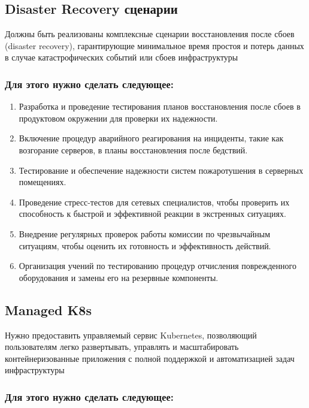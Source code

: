 \documentclass[14pt, a4paper]{extarticle}
\begin{document}
\subsection{Disaster Recovery сценарии}

Должны быть реализованы комплексные сценарии восстановления после сбоев (disaster recovery), гарантирующие минимальное время простоя и потерь данных в случае катастрофических событий или сбоев инфраструктуры

\subsubsection*{Для этого нужно сделать следующее:}

\begin{enumerate}
\item Разработка и проведение тестирования планов восстановления после сбоев в продуктовом окружении для проверки их надежности.
\item Включение процедур аварийного реагирования на инциденты, такие как возгорание серверов, в планы восстановления после бедствий.
\item Тестирование и обеспечение надежности систем пожаротушения в серверных помещениях.
\item Проведение стресс-тестов для сетевых специалистов, чтобы проверить их способность к быстрой и эффективной реакции в экстренных ситуациях.
\item Внедрение регулярных проверок работы комиссии по чрезвычайным ситуациям, чтобы оценить их готовность и эффективность действий.
\item Организация учений по тестированию процедур отчисления поврежденного оборудования и замены его на резервные компоненты.
\end{enumerate}

\subsection{Managed K8s}

Нужно предоставить управляемый сервис Kubernetes, позволяющий пользователям легко развертывать, управлять и масштабировать контейнеризованные приложения с полной поддержкой и автоматизацией задач инфраструктуры

\subsubsection*{Для этого нужно сделать следующее:}
\end{document}
